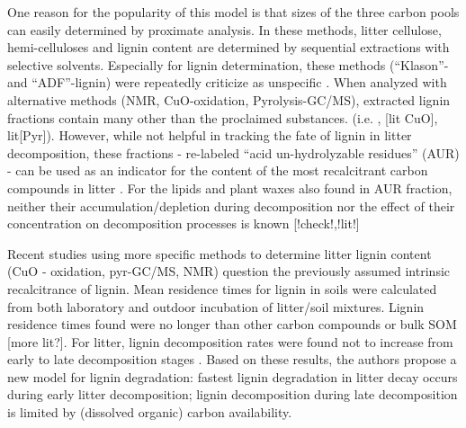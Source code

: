 
One reason for the popularity of this model is that sizes of the three carbon pools can easily determined by proximate analysis. In these methods, litter cellulose, hemi-celluloses and lignin content are determined by sequential extractions with selective solvents. Especially for lignin determination, these methods (``Klason''- and ``ADF''-lignin) were repeatedly criticize as unspecific \citep{Hatfield2005}. When analyzed with alternative methods (NMR, CuO-oxidation, Pyrolysis-GC/MS), extracted lignin fractions contain many other than the proclaimed substances. (i.e. \cite{Preston1997}, [lit CuO], lit[Pyr]). However, while not helpful in tracking the fate of lignin in litter decomposition, these fractions - re-labeled ``acid un-hydrolyzable residues'' (AUR) - can be used as an indicator for the content of the most recalcitrant carbon compounds in litter \citep{Prescott2010}. For the lipids and plant waxes also found in AUR fraction, neither their accumulation/depletion during decomposition nor the effect of their concentration on decomposition processes is known [!check!,!lit!]




Recent studies using more specific methods to determine litter lignin content (CuO - oxidation, pyr-GC/MS, NMR) question the previously assumed intrinsic recalcitrance of lignin. Mean residence times for lignin in soils were calculated from both laboratory and outdoor incubation of litter/soil mixtures. Lignin residence times found were no longer than other carbon compounds or bulk SOM \citep{Thevenot2010a, Bol2009} [more lit?]. For litter, lignin decomposition rates were found not to increase from early to late decomposition stages \citep{Klotzbucher2011}. Based on these results, the authors propose a new model for lignin degradation: fastest lignin degradation in litter decay occurs during early litter decomposition; lignin decomposition during late decomposition is limited by (dissolved organic) carbon availability. 

